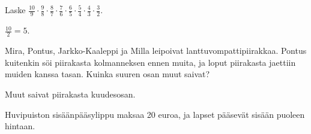 \begin{tehtavasivu}
        \begin{tehtava}
	\begin{alakohdatrivi}
	\end{alakohdatrivi}
	\begin{vastaus}
		\begin{alakohdatrivi}
			\alakohta{$\frac{20}{9}$}
			\alakohta{$\frac{18}{35}$}
			\alakohta{$\frac{1}{2}$}
		\end{alakohdatrivi}
	\end{vastaus}
\end{tehtava}

\begin{tehtava}
    Laske 
    $\frac{10}{9}\cdot \frac{9}{8}\cdot \frac{8}{7}\cdot \frac{7}{6}\cdot \frac{6}{5}
    \cdot \frac{5}{4}\cdot \frac{4}{3}\cdot \frac{3}{2}$.
    \begin{vastaus}
		$\frac{10}{2}=5$.
    \end{vastaus}        
\end{tehtava}
    
    \begin{tehtava}
        Mira, Pontus, Jarkko-Kaaleppi ja Milla leipoivat lanttuvompattipiirakkaa.
        Pontus kuitenkin söi piirakasta kolmanneksen ennen muita, ja loput piirakasta
        jaettiin muiden kanssa tasan. Kuinka suuren osan muut saivat?
        
        \begin{vastaus}
            Muut saivat piirakasta kuudesosan.
        \end{vastaus}
    \end{tehtava}
    
\begin{tehtava}
    Huvipuiston sisäänpääsylippu maksaa 20 euroa, ja lapset pääsevät sisään puoleen hintaan.
	\begin{alakohdat}
    \end{alakohdat}
    \begin{vastaus}
		\begin{alakohdat}
		\end{alakohdat} 
    \end{vastaus}
\end{tehtava}  


\end{tehtavasivu}
